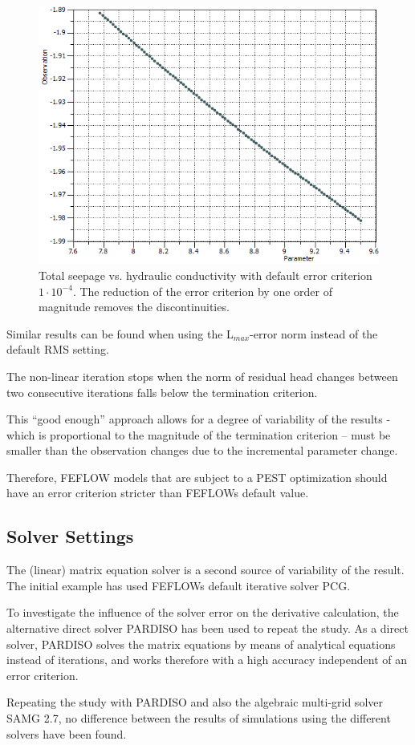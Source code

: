 \begin{figure}
	\center
	\includegraphics[width=\columnwidth]{figures/stabil-con-body-e1-4_100it.png}
\caption{Total seepage vs. hydraulic conductivity with default error criterion $1 \cdot 10^{-4}$. The reduction of the error criterion by one order of magnitude removes the discontinuities.}
\label{fig:fepest:stabil-con-body-e1-4_100it}
\end{figure}

Similar results can be found when using the L$_{max}$-error norm instead of the default RMS setting.

The non-linear iteration stops when the norm of residual head changes between two consecutive iterations falls below the termination criterion. 

This “good enough” approach allows for a degree of variability of the results - which is proportional to the magnitude of the termination criterion – must be smaller than the observation changes due to the incremental parameter change.

Therefore, FEFLOW models that are subject to a PEST optimization should have an error criterion stricter than FEFLOWs default value.

\subsection{Solver Settings}

The (linear) matrix equation solver is a second source of variability of the result. The initial example has used FEFLOWs default iterative solver PCG.

To investigate the influence of the solver error on the derivative calculation, the alternative direct solver PARDISO has been used to repeat the study. As a direct solver, PARDISO solves the matrix equations by means of analytical equations instead of iterations, and works therefore with a high accuracy independent of an error criterion.

Repeating the study with PARDISO and also the algebraic multi-grid solver SAMG 2.7, no difference between the results of simulations using the different solvers have been found.

